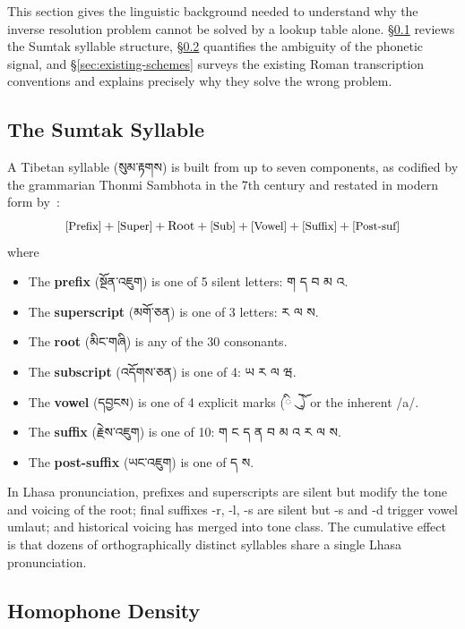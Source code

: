 \documentclass[11pt]{article}
\newcommand{\tib}[1]{{\fontspec{Jomolhari}#1}}
\begin{document}
This section gives the linguistic background needed to understand why the inverse resolution problem cannot be solved by a lookup table alone. \S\ref{sec:sumtak-background} reviews the Sumtak syllable structure, \S\ref{sec:homophone-density} quantifies the ambiguity of the phonetic signal, and \S\ref{sec:existing-schemes} surveys the existing Roman transcription conventions and explains precisely why they solve the wrong problem.

\subsection{The Sumtak Syllable}
\label{sec:sumtak-background}

A Tibetan syllable (\tib{སུམ་རྟགས}) is built from up to seven components, as codified by the grammarian Thonmi Sambhota in the 7th century and restated in modern form by~\citet{tonyduff}:
\[
\text{\small[Prefix]} + \text{\small[Super]} + \text{Root} + \text{\small[Sub]} + \text{\small[Vowel]} + \text{\small[Suffix]} + \text{\small[Post-suf]}
\]
where
\begin{itemize}
\item The \textbf{prefix} (སྔོན་འཇུག) is one of 5 silent letters: ག ད བ མ འ.
\item The \textbf{superscript} (མགོ་ཅན) is one of 3 letters: ར ལ ས.
\item The \textbf{root} (མིང་གཞི) is any of the 30 consonants.
\item The \textbf{subscript} (འདོགས་ཅན) is one of 4: ཡ ར ལ ཝ.
\item The \textbf{vowel} (དབྱངས) is one of 4 explicit marks (ི ུ ེ ོ) or the inherent /a/.
\item The \textbf{suffix} (རྗེས་འཇུག) is one of 10: ག ང ད ན བ མ འ ར ལ ས.
\item The \textbf{post-suffix} (ཡང་འཇུག) is one of ད ས.
\end{itemize}

In Lhasa pronunciation, prefixes and superscripts are silent but modify the tone and voicing of the root; final suffixes -r, -l, -s are silent but -s and -d trigger vowel umlaut; and historical voicing has merged into tone class. The cumulative effect is that dozens of orthographically distinct syllables share a single Lhasa pronunciation.

\subsection{Homophone Density}
\label{sec:homophone-density}
\end{document}
